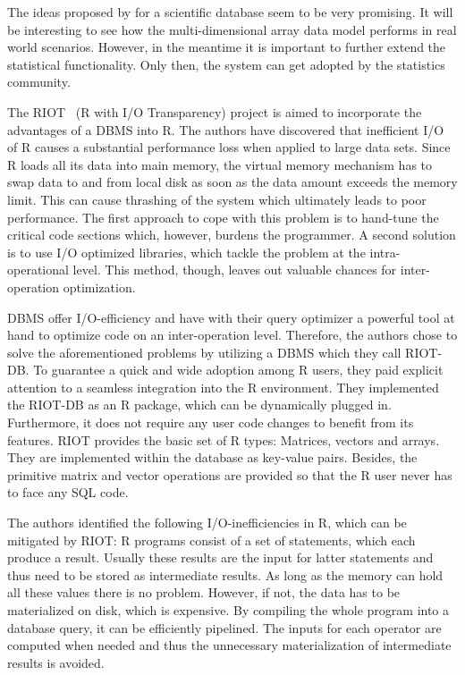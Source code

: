 The ideas proposed by \citeauthor{stonebraker:2009a} for a scientific database seem to be very promising.
It will be interesting to see how the multi-dimensional array data model performs in real world scenarios.
However, in the meantime it is important to further extend the statistical functionality.
Only then, the system can get adopted by the statistics community.

The RIOT~\cite{zhang:apa2009a} (R with I/O Transparency) project is aimed to incorporate the advantages of a DBMS into R.
The authors \citeauthor{zhang:apa2009a} have discovered that inefficient I/O of R causes a substantial performance loss when applied to large data sets.
Since R loads all its data into main memory, the virtual memory mechanism has to swap data to and from local disk as soon as the data amount exceeds the memory limit.
This can cause thrashing of the system which ultimately leads to poor performance.
The first approach to cope with this problem is to hand-tune the critical code sections which, however, burdens the programmer.
A second solution is to use I/O optimized libraries, which tackle the problem at the intra-operational level.
This method, though, leaves out valuable chances for inter-operation optimization.

DBMS offer I/O-efficiency and have with their query optimizer a powerful tool at hand to optimize code on an inter-operation level.
Therefore, the authors chose to solve the aforementioned problems by utilizing a DBMS which they call RIOT-DB.
To guarantee a quick and wide adoption among R users, they paid explicit attention to a seamless integration into the R environment.
They implemented the RIOT-DB as an R package, which can be dynamically plugged in.
Furthermore, it does not require any user code changes to benefit from its features.
RIOT provides the basic set of R types: Matrices, vectors and arrays.
They are implemented within the database as key-value pairs.
Besides, the primitive matrix and vector operations are provided so that the R user never has to face any SQL code.

The authors identified the following I/O-inefficiencies in R, which can be mitigated by RIOT:
R programs consist of a set of statements, which each produce a result.
Usually these results are the input for latter statements and thus need to be stored as intermediate results.
As long as the memory can hold all these values there is no problem.
However, if not, the data has to be materialized on disk, which is expensive.
By compiling the whole program into a database query, it can be efficiently pipelined.
The inputs for each operator are computed when needed and thus the unnecessary materialization of intermediate results is avoided.

